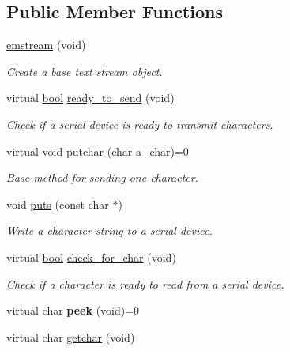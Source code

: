 \subsection*{Public Member Functions}
\begin{DoxyCompactItemize}
\item 
\mbox{\hyperlink{classemstream_ad19a1ff84926b5fd5feac71fc2f7fb51}{emstream}} (void)
\begin{DoxyCompactList}\small\item\em Create a base text stream object. \end{DoxyCompactList}\item 
virtual \mbox{\hyperlink{group___motor___boolean___type_ga0ecf26b576b9a54eca656b9be7ba6a06}{bool}} \mbox{\hyperlink{classemstream_a28149c19ad19d10d89ca8dd3d3803b1a}{ready\+\_\+to\+\_\+send}} (void)
\begin{DoxyCompactList}\small\item\em Check if a serial device is ready to transmit characters. \end{DoxyCompactList}\item 
virtual void \mbox{\hyperlink{classemstream_aa4dffc9aa58f601cc4153b4cbe65d757}{putchar}} (char a\+\_\+char)=0
\begin{DoxyCompactList}\small\item\em Base method for sending one character. \end{DoxyCompactList}\item 
void \mbox{\hyperlink{classemstream_a1ad530cbebe6c54640c1db8c1b9afda2}{puts}} (const char $\ast$)
\begin{DoxyCompactList}\small\item\em Write a character string to a serial device. \end{DoxyCompactList}\item 
virtual \mbox{\hyperlink{group___motor___boolean___type_ga0ecf26b576b9a54eca656b9be7ba6a06}{bool}} \mbox{\hyperlink{classemstream_a64494c4283e4750d29d93df245045d56}{check\+\_\+for\+\_\+char}} (void)
\begin{DoxyCompactList}\small\item\em Check if a character is ready to read from a serial device. \end{DoxyCompactList}\item 
\mbox{\label{classemstream_af514146b9ca7d4091a688b413b422d50}} 
virtual char {\bfseries peek} (void)=0
\item 
virtual char \mbox{\hyperlink{classemstream_a41f0814540d5baa7312310c59077a248}{getchar}} (void)

\end{DoxyCompactItemize}
